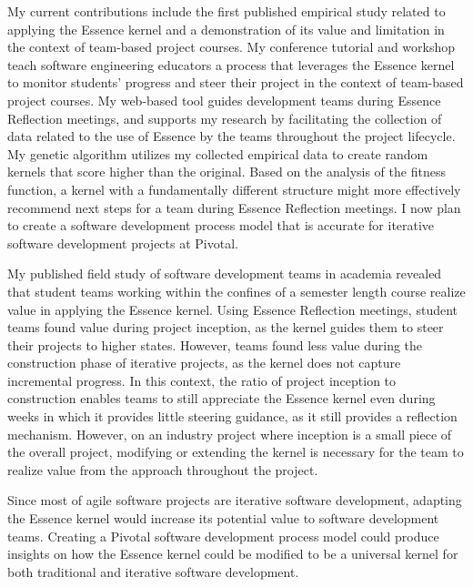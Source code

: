 \documentclass[preprint,12pt,3p]{elsarticle}
\begin{document}
My current contributions include the first published empirical study related to applying the Essence kernel and a demonstration of its value and limitation in the context of team-based project courses. My conference tutorial and workshop teach software engineering educators a process that leverages the Essence kernel to monitor students' progress and steer their project in the context of team-based project courses. My web-based tool guides development teams during Essence Reflection meetings, and supports my research by facilitating the collection of data related to the use of Essence by the teams throughout the project lifecycle. My genetic algorithm utilizes my collected empirical data to create random kernels that score higher than the original. Based on the analysis of the fitness function, a kernel with a fundamentally different structure might more effectively recommend next steps for a team during Essence Reflection meetings. I now plan to create a software development process model that is accurate for iterative software development projects at Pivotal.

My published field study of software development teams in academia revealed that student teams working within the confines of a semester length course realize value in applying the Essence kernel. Using Essence Reflection meetings, student teams found value during project inception, as the kernel guides them to steer their projects to higher states. However, teams found less value during the construction phase of iterative projects, as the kernel does not capture incremental progress. In this context, the ratio of project inception to construction enables teams to still appreciate the Essence kernel even during weeks in which it provides little steering guidance, as it still provides a reflection mechanism. However, on an industry project where inception is a small piece of the overall project, modifying or extending the kernel is necessary for the team to realize value from the approach throughout the project.

Since most of agile software projects are iterative software development, adapting the Essence kernel would increase its potential value to software development teams. Creating a Pivotal software development process model could produce insights on how the Essence kernel could be modified to be a universal kernel for both traditional and iterative software development.
\end{document}
